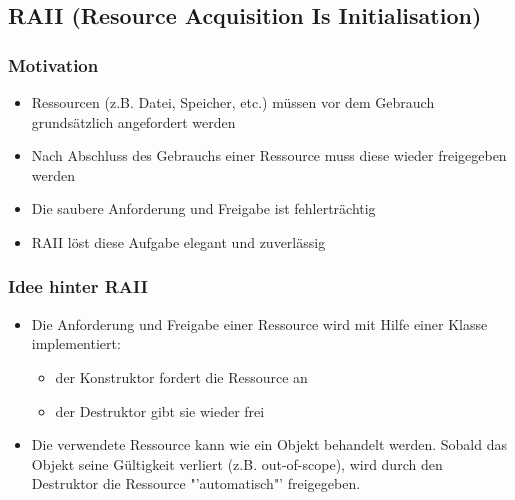 \subsection{RAII (Resource Acquisition Is Initialisation)}
\subsubsection{Motivation}
\begin{itemize}[noitemsep,topsep=0pt]
  \item Ressourcen (z.B. Datei, Speicher, etc.) müssen vor dem Gebrauch grundsätzlich angefordert werden
  \item Nach Abschluss des Gebrauchs einer Ressource muss diese wieder freigegeben werden
  \item Die saubere Anforderung und Freigabe ist fehlerträchtig
  \item RAII löst diese Aufgabe elegant und zuverlässig
\end{itemize}

\subsubsection{Idee hinter RAII}
\begin{itemize}[noitemsep,topsep=0pt]
  \item Die Anforderung und Freigabe einer Ressource wird mit Hilfe einer Klasse implementiert:
        \begin{itemize}
          \item der Konstruktor fordert die Ressource an
          \item der Destruktor gibt sie wieder frei
        \end{itemize}
  \item Die verwendete Ressource kann wie ein Objekt behandelt werden. Sobald das Objekt seine Gültigkeit verliert (z.B. out-of-scope), wird durch den Destruktor die Ressource "'automatisch"' freigegeben.
\end{itemize}

